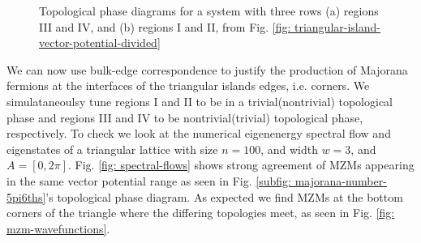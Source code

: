 \documentclass[aps,prb,showpacs,amsmath,amssymb,superscriptaddress]{revtex4-2}
\begin{document}
\begin{figure}[]
  \hfill
  \hfill
  \caption{Topological phase diagrams for a system with three rows (a) regions III and IV, and (b) regions I and II, from Fig. \ref{fig: triangular-island-vector-potential-divided}}
  \label{fig: majorana-number}
\end{figure}

We can now use bulk-edge correspondence to justify the production of Majorana fermions at the interfaces of the triangular islands edges, i.e. corners.
We simulataneoulsy tune regions I and II to be in a trivial(nontrivial) topological phase and regions III and IV to be nontrivial(trivial) topological phase, respectively.
To check we look at the numerical eigenenergy spectral flow and eigenstates of a triangular lattice with size $n=100$, and width $w=3$, and $A = [0,2\pi]$.
Fig. \ref{fig: spectral-flows} shows strong agreement of MZMs appearing in the same vector potential range as seen in Fig. \ref{subfig: majorana-number-5pi6ths}'s topological phase diagram.
As expected we find MZMs at the bottom corners of the triangle where the differing topologies meet, as seen in Fig. \ref{fig: mzm-wavefunctions}.
\end{document}
